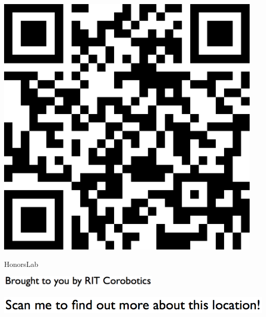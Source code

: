 \documentclass[letterpaper]{article}
\begin{document}
 \begingroup 
 \centerline{\includegraphics[scale=1,width=5in,height=5in]{HonorsLab.png}} 
 \endgroup 
 \vspace*{\fill} 

 \hfill{\small HonorsLab} 

  \vspace{0.7in} 
 
 \centerline{\includegraphics[scale=1,width=3in]{text-bottom.png}} 
 
 \pagebreak 
{} 
 \vspace*{\fill} 
 
  \centerline{\includegraphics[scale=1,width=6in]{text-top.png}} 
 
 \vspace{0.5in} 
 
\end{document}
